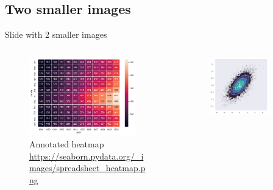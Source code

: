 \documentclass[aspectratio=169, 10pt]{beamer}
\begin{document}
\subsection{Two smaller images}
\begin{frame}[fragile]{Slide with 2 smaller images}
    \begin{columns}
        \centering
        \begin{column}{0.44\textwidth}
            \vspace{0.3cm}
            \begin{figure}[!htbp]%
                \centering
                \includegraphics[width=0.9\textwidth]{images/spreadsheet_heatmap.png}
                \caption{Annotated heatmap\\
                \tiny\url{https://seaborn.pydata.org/_images/spreadsheet_heatmap.png}}
            \end{figure}
        \end{column}
        \begin{column}{0.44\textwidth}
            \begin{figure}[!htbp]%
                \centering
                \includegraphics[width=0.75\textwidth]{images/layered_bivariate_plot.png}

\end{figure}
\end{column}
\end{columns}
\end{frame}
\end{document}
